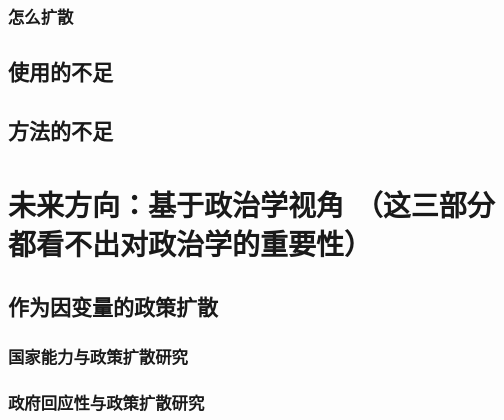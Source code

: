 \documentclass[
  12pt,
]{ctexart}
\begin{document}
\hypertarget{ux600eux4e48ux6269ux6563}{%
\subsubsection{怎么扩散}\label{ux600eux4e48ux6269ux6563}}

\hypertarget{ux4f7fux7528ux7684ux4e0dux8db3}{%
\subsection{使用的不足}\label{ux4f7fux7528ux7684ux4e0dux8db3}}

\hypertarget{ux65b9ux6cd5ux7684ux4e0dux8db3}{%
\subsection{方法的不足}\label{ux65b9ux6cd5ux7684ux4e0dux8db3}}

\hypertarget{ux672aux6765ux65b9ux5411ux57faux4e8eux653fux6cbbux5b66ux89c6ux89d2-ux8fd9ux4e09ux90e8ux5206ux90fdux770bux4e0dux51faux5bf9ux653fux6cbbux5b66ux7684ux91cdux8981ux6027}{%
\section{未来方向：基于政治学视角 （这三部分都看不出对政治学的重要性）}\label{ux672aux6765ux65b9ux5411ux57faux4e8eux653fux6cbbux5b66ux89c6ux89d2-ux8fd9ux4e09ux90e8ux5206ux90fdux770bux4e0dux51faux5bf9ux653fux6cbbux5b66ux7684ux91cdux8981ux6027}}

\hypertarget{ux4f5cux4e3aux56e0ux53d8ux91cfux7684ux653fux7b56ux6269ux6563}{%
\subsection{作为因变量的政策扩散}\label{ux4f5cux4e3aux56e0ux53d8ux91cfux7684ux653fux7b56ux6269ux6563}}

\hypertarget{ux56fdux5bb6ux80fdux529bux4e0eux653fux7b56ux6269ux6563ux7814ux7a76}{%
\subsubsection{国家能力与政策扩散研究}\label{ux56fdux5bb6ux80fdux529bux4e0eux653fux7b56ux6269ux6563ux7814ux7a76}}

\hypertarget{ux653fux5e9cux56deux5e94ux6027ux4e0eux653fux7b56ux6269ux6563ux7814ux7a76}{%
\subsubsection{政府回应性与政策扩散研究}\label{ux653fux5e9cux56deux5e94ux6027ux4e0eux653fux7b56ux6269ux6563ux7814ux7a76}}
\end{document}
